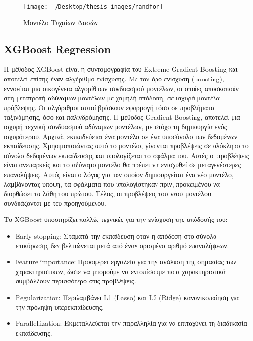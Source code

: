 \documentclass[diploma]{softlab-thesis}
\begin{document}
\begin{figure}[h]
    \centering
    \texttt{[image: ~/Desktop/thesis\_images/randfor]} %
    \caption{Μοντέλο Τυχαίων Δασών}
    \label{fig:your_image_label}
\end{figure}

\subsection{XGBoost Regression}

Η μέθοδος XGBoost είναι η συντομογραφία του Extreme Gradient Boosting και αποτελεί επίσης έναν αλγόριθμο ενίσχυσης. Με τον όρο ενίσχυση (boosting), εννοείται μια οικογένεια αλγορίθμων συνδυασμού μοντέλων, οι οποίες αποσκοπούν στη μετατροπή αδύναμων μοντέλων με χαμηλή απόδοση, σε ισχυρά μοντέλα πρόβλεψης. Οι αλγόριθμοι αυτοί βρίσκουν εφαρμογή τόσο σε προβλήματα ταξινόμησης, όσο
και παλινδρόμησης. Η μέθοδος Gradient Boosting, αποτελεί μια ισχυρή τεχνική συνδυασμού αδύναμων μοντέλων, με στόχο τη δημιουργία ενός ισχυρότερου. Αρχικά, εκπαιδεύεται ένα μοντέλο σε ένα υποσύνολο των δεδομένων εκπαίδευσης. Χρησιμοποιώντας αυτό το μοντέλο, γίνονται προβλέψεις σε ολόκληρο το σύνολο δεδομένων εκπαίδευσης και υπολογίζεται το σφάλμα του. Αυτές οι προβλέψεις είναι ανεπαρκείς και το αδύναμο μοντέλο θα πρέπει να ενισχυθεί σε μεταγενέστερες επαναλήψεις. Αυτός είναι ο λόγος για τον οποίον δημιουργείται ένα νέο μοντέλο, λαμβάνοντας υπόψη, τα σφάλματα που υπολογίστηκαν πριν, προκειμένου να διορθώσει τα λάθη του πρώτου. Τέλος, οι προβλέψεις του νέου μοντέλου συνδυάζονται με του προηγούμενου. 

Το XGBoost υποστηρίζει πολλές τεχνικές για την ενίσχυση της απόδοσής του:
\begin{itemize}
\item Early stopping: Σταματά την εκπαίδευση όταν η απόδοση στο σύνολο επικύρωσης δεν βελτιώνεται μετά από έναν ορισμένο αριθμό επαναλήψεων.
\item Feature importance: Προσφέρει εργαλεία για την ανάλυση της σημασίας των χαρακτηριστικών, ώστε να μπορούμε να εντοπίσουμε ποια χαρακτηριστικά συμβάλλουν περισσότερο στις προβλέψεις.
\item Regularization: Περιλαμβάνει L1 (Lasso) και L2 (Ridge) κανονικοποίηση για την πρόληψη υπερεκπαίδευσης.
\item Parallellization: Εκμεταλλεύεται την παραλληλία για να επιταχύνει τη διαδικασία εκπαίδευσης.
\end{itemize}
\end{document}
